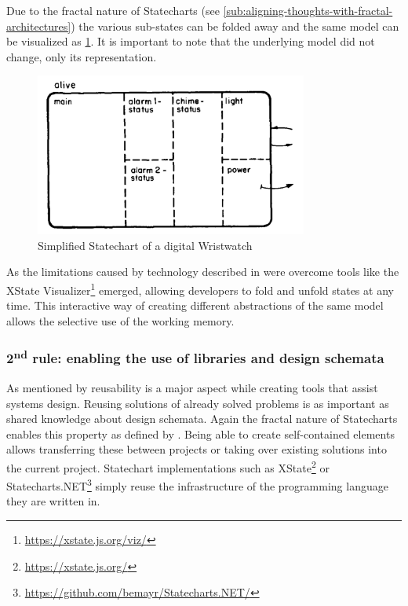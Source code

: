 Due to the fractal nature of Statecharts (see \cref{sub:aligning-thoughts-with-fractal-architectures}) the various sub-states can be folded away and the same model can be visualized as \cref{fig:simplified-wristwatch-statechart}.
It is important to note that the underlying model did not change, only its representation.
\begin{figure}[h]
\centering
\includegraphics[width=0.8\textwidth]{images/abstract-watch-statechart}
\caption{Simplified Statechart of a digital Wristwatch}
\label{fig:simplified-wristwatch-statechart}
\end{figure}
As the limitations caused by technology described in \textcite{harel_statecharts:_1987} were overcome tools like the XState Visualizer\footnote{\url{https://xstate.js.org/viz/}} emerged, allowing developers to fold and unfold states at any time.
This interactive way of creating different abstractions of the same model allows the selective use of the working memory.

\subsubsection{2\textsuperscript{nd} rule: enabling the use of libraries and design schemata}
As mentioned by \textcite{visser_expert_1990} reusability is a major aspect while creating tools that assist systems design.
Reusing solutions of already solved problems is as important as shared knowledge about design schemata.
Again the fractal nature of Statecharts enables this property as defined by \citeauthor{visser_expert_1990}.
Being able to create self-contained elements allows transferring these between projects or taking over existing solutions into the current project.
Statechart implementations such as XState\footnote{\url{https://xstate.js.org/}} or Statecharts.NET\footnote{\url{https://github.com/bemayr/Statecharts.NET/}} simply reuse the infrastructure of the programming language they are written in.


